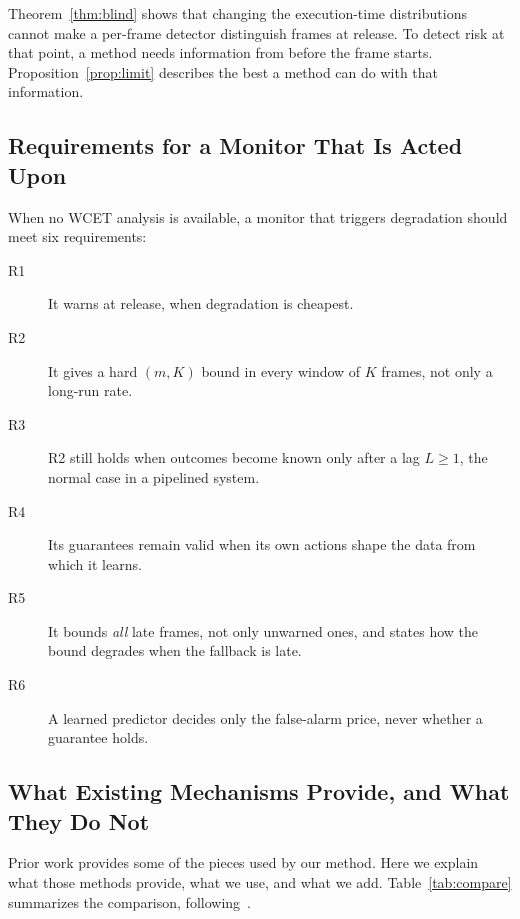 \documentclass[acmsmall,screen]{acmart}
\begin{document}
Theorem~\ref{thm:blind} shows that changing the execution-time distributions cannot make a per-frame detector distinguish frames at release. To detect risk at that point, a method needs information from before the frame starts. Proposition~\ref{prop:limit} describes the best a method can do with that information.

\subsection{Requirements for a Monitor That Is Acted Upon}\label{sec:req}

When no WCET analysis is available, a monitor that triggers degradation should meet six requirements:
\begin{description}
\item[R1] It warns at release, when degradation is cheapest.
\item[R2] It gives a hard $(m,K)$ bound in every window of $K$ frames, not only a long-run rate.
\item[R3] R2 still holds when outcomes become known only after a lag $L\ge1$, the normal case in a pipelined system.
\item[R4] Its guarantees remain valid when its own actions shape the data from which it learns.
\item[R5] It bounds \emph{all} late frames, not only unwarned ones, and states how the bound degrades when the fallback is late.
\item[R6] A learned predictor decides only the false-alarm price, never whether a guarantee holds.
\end{description}

\subsection{What Existing Mechanisms Provide, and What They Do Not}\label{sec:position}

Prior work provides some of the pieces used by our method. Here we explain what those methods provide, what we use, and what we add. Table~\ref{tab:compare} summarizes the comparison, following~\cite{toba2026}.
\end{document}
